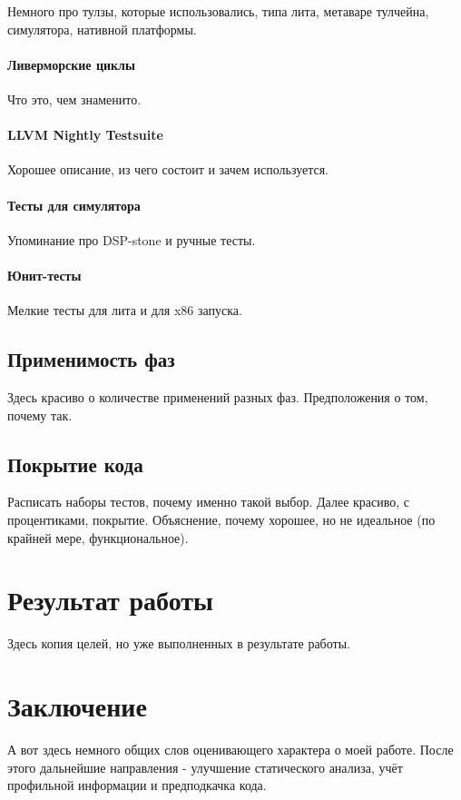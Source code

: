\documentclass[12pt,a4paper]{article}
\begin{document}
Немного про тулзы, которые использовались, типа лита, метаваре тулчейна, симулятора, нативной платформы.

\paragraph{Ливерморские циклы}

Что это, чем знаменито.

\paragraph{LLVM Nightly Testsuite}

Хорошее описание, из чего состоит и зачем используется.

\paragraph{Тесты для симулятора}

Упоминание про DSP-stone и ручные тесты.

\paragraph{Юнит-тесты}

Мелкие тесты для лита и для x86 запуска.

\subsection{Применимость фаз}

Здесь красиво о количестве применений разных фаз. Предположения о том, почему так.

\subsection{Покрытие кода}

Расписать наборы тестов, почему именно такой выбор. Далее красиво, с процентиками, покрытие. Объяснение, почему хорошее, но не идеальное (по крайней мере, функциональное).

\section{Результат работы}

Здесь копия целей, но уже выполненных в результате работы.

\section{Заключение}

А вот здесь немного общих слов оценивающего характера о моей работе. После этого дальнейшие направления - улучшение статического анализа, учёт профильной информации и предподкачка кода.
\end{document}
